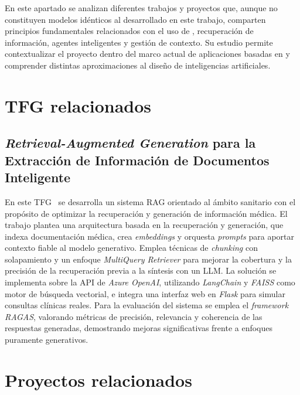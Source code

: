 
En este apartado se analizan diferentes trabajos y proyectos que, aunque no constituyen modelos  idénticos al desarrollado en este trabajo, comparten principios fundamentales relacionados con el uso de , recuperación de información, agentes inteligentes y gestión de contexto. Su estudio permite contextualizar el proyecto dentro del marco actual de aplicaciones basadas en  y comprender distintas aproximaciones al diseño de inteligencias artificiales.

\section{TFG relacionados}
\subsection{\textit{Retrieval-Augmented Generation} para la Extracción de Información de Documentos Inteligente}
En este TFG~\cite{trabajorelacionado:Daniel} se desarrolla un sistema RAG orientado al ámbito sanitario con el propósito de optimizar la recuperación y generación de información médica. El trabajo plantea una arquitectura basada en la recuperación y generación, que indexa documentación médica, crea \textit{embeddings} y orquesta \textit{prompts} para aportar contexto fiable al modelo generativo. Emplea técnicas de \textit{chunking} con solapamiento y un enfoque \textit{MultiQuery Retriever} para mejorar la cobertura y la precisión de la recuperación previa a la síntesis con un LLM. La solución se implementa sobre la API de \textit{Azure OpenAI}, utilizando \textit{LangChain} y \textit{FAISS} como motor de búsqueda vectorial, e integra una interfaz web en \textit{Flask} para simular consultas clínicas reales. Para la evaluación del sistema se emplea el \textit{framework RAGAS}, valorando métricas de precisión, relevancia y coherencia de las respuestas generadas, demostrando mejoras significativas frente a enfoques puramente generativos. 

\section{Proyectos relacionados}
